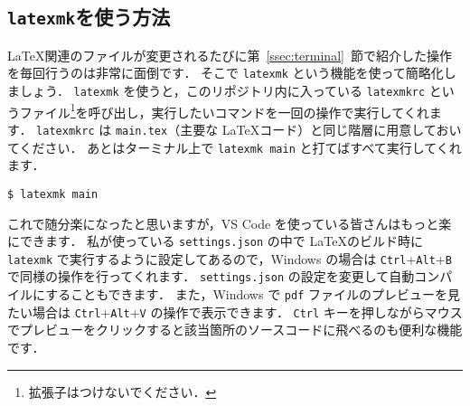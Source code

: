 \subsection{\texttt{latexmk}を使う方法}
\label{ssec:latexmk}

\LaTeX 関連のファイルが変更されるたびに第~\ref{ssec:terminal}~節で紹介した操作を毎回行うのは非常に面倒です．
そこで \verb|latexmk| という機能を使って簡略化しましょう．
\verb|latexmk| を使うと，このリポジトリ内に入っている \verb|latexmkrc| というファイル\footnote{拡張子はつけないでください．}を呼び出し，実行したいコマンドを一回の操作で実行してくれます．
\verb|latexmkrc| は \verb|main.tex|（主要な \LaTeX コード）と同じ階層に用意しておいてください．
あとはターミナル上で \verb|latexmk main| と打てばすべて実行してくれます．

\begin{tcolorbox}[enhanced, title=\texttt{latexmk}を使用, drop fuzzy shadow, colback=red!5!white, colframe=red!75!black]
\begin{verbatim}
$ latexmk main
\end{verbatim}
\end{tcolorbox}

これで随分楽になったと思いますが，VS Code を使っている皆さんはもっと楽にできます．
私が使っている \verb|settings.json| の中で \LaTeX のビルド時に \verb|latexmk| で実行するように設定してあるので，Windows の場合は \verb|Ctrl|+\verb|Alt|+\verb|B| で同様の操作を行ってくれます．
\verb|settings.json| の設定を変更して自動コンパイルにすることもできます．
また，Windows で \verb|pdf| ファイルのプレビューを見たい場合は \verb|Ctrl|+\verb|Alt|+\verb|V| の操作で表示できます．
\verb|Ctrl| キーを押しながらマウスでプレビューをクリックすると該当箇所のソースコードに飛べるのも便利な機能です．






